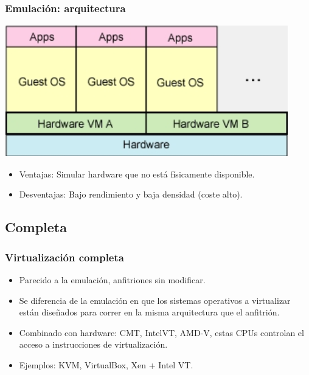 \documentclass{beamer}
\begin{document}
\begin{frame}
\frametitle{Emulación: arquitectura}
\begin{center}
\includegraphics[scale=0.35,clip=false]{figs/emulation.png}
\end{center}

\begin{itemize}
\item \alert{Ventajas:} Simular hardware que no está físicamente disponible.
\item \alert{Desventajas:} Bajo rendimiento y baja densidad (coste alto).
\end{itemize}


\end{frame}



\subsection{Completa}


\begin{frame}
\frametitle{Virtualización completa}

\begin{itemize}
\item Parecido a la emulación, anfitriones sin modificar.
\item Se diferencia de la emulación en que los sistemas operativos a virtualizar están diseñados para correr en la misma arquitectura que el anfitrión.
\item Combinado con hardware: CMT, IntelVT, AMD-V, estas CPUs controlan el acceso a instrucciones de virtualización.
\item \alert{Ejemplos:} KVM, VirtualBox, Xen + Intel VT. 
\end{itemize}
\end{frame}

\end{document}
